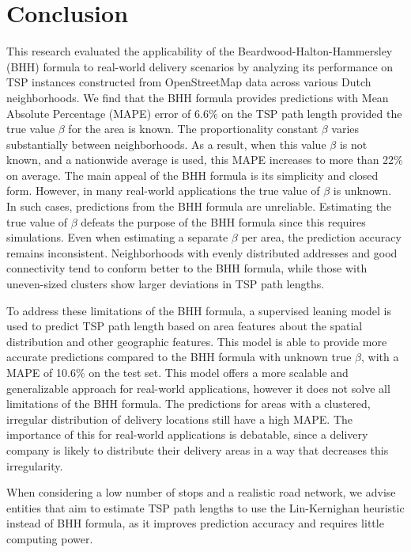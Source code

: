 \section{Conclusion}
This research evaluated the applicability of the Beardwood-Halton-Hammersley (BHH) formula to real-world delivery scenarios by analyzing its performance on TSP instances constructed from OpenStreetMap data across various Dutch neighborhoods.
We find that the BHH formula provides predictions with Mean Absolute Percentage (MAPE) error of 6.6\% on the TSP path length provided the true value $\beta$ for the area is known.
The proportionality constant $\beta$ varies substantially between neighborhoods.
As a result, when this value $\beta$ is not known, and a nationwide average is used, this MAPE increases to more than 22\% on average.
The main appeal of the BHH formula is its simplicity and closed form.
However, in many real-world applications the true value of $\beta$ is unknown.
In such cases, predictions from the BHH formula are unreliable.
Estimating the true value of $\beta$ defeats the purpose of the BHH formula since this requires simulations.
Even when estimating a separate $\beta$ per area, the prediction accuracy remains inconsistent.
Neighborhoods with evenly distributed addresses and good connectivity tend to conform better to the BHH formula, while those with uneven-sized clusters show larger deviations in TSP path lengths.

To address these limitations of the BHH formula, a supervised leaning model is used to predict TSP path length based on area features about the spatial distribution
and other geographic features. This model is able to provide more accurate predictions compared to the BHH formula with unknown true $\beta$, with a MAPE of 10.6\% on the test set.
This model offers a more scalable and generalizable approach for real-world applications, however it does not solve all limitations of the BHH formula.
The predictions for areas with a clustered, irregular distribution of delivery locations still have a high MAPE.
The importance of this for real-world applications is debatable, since a delivery company is likely to distribute their delivery areas in a way that decreases this irregularity.

When considering a low number of stops and a realistic road network,
we advise entities that aim to estimate TSP path lengths to use the Lin-Kernighan heuristic instead of BHH formula, as it improves prediction accuracy and requires little computing power.

